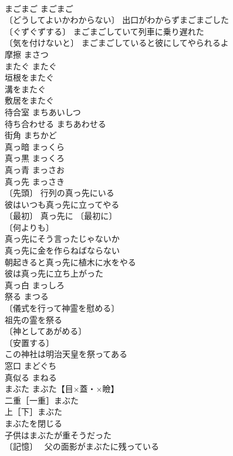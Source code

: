 \documentclass[8pt]{extreport}
\begin{document}
\begin{CJK}{UTF8}{min}
\\	まごまご	まごまご	
\\	〔どうしてよいかわからない〕 出口がわからずまごまごした 
\\	〔ぐずぐずする〕 まごまごしていて列車に乗り遅れた 
\\	〔気を付けないと〕 まごまごしていると彼にしてやられるよ 
\\	摩擦	まさつ	
\\	またぐ	またぐ	
\\	垣根をまたぐ 
\\	溝をまたぐ 
\\	敷居をまたぐ 
\\	待合室	まちあいしつ	
\\	待ち合わせる	まちあわせる	
\\	街角	まちかど	
\\	真っ暗	まっくら	
\\	真っ黒	まっくろ	
\\	真っ青	まっさお	
\\	真っ先	まっさき	
\\	〔先頭〕 行列の真っ先にいる 
\\	彼はいつも真っ先に立ってやる 
\\	〔最初〕 真っ先に 〔最初に〕
\\	〔何よりも〕
\\	真っ先にそう言ったじゃないか 
\\	真っ先に金を作らねばならない 
\\	朝起きると真っ先に植木に水をやる 
\\	彼は真っ先に立ち上がった 
\\	真っ白	まっしろ	
\\	祭る	まつる	
\\	〔儀式を行って神霊を慰める〕
\\	祖先の霊を祭る 
\\	〔神としてあがめる〕
\\	〔安置する〕
\\	この神社は明治天皇を祭ってある 
\\	窓口	まどぐち	
\\	真似る	まねる	
\\	まぶた	まぶた【目×蓋・×瞼】	
\\	二重［一重］まぶた 
\\	上［下］まぶた 
\\	まぶたを閉じる 
\\	子供はまぶたが重そうだった 
\\	〔記憶〕　 父の面影がまぶたに残っている 

\end{CJK}
\end{document}
